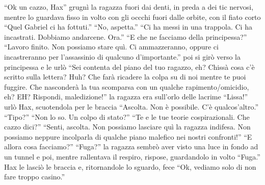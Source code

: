     ``Ok un cazzo, Hax'' grugnì la ragazza fuori dai denti, in preda a dei tic nervosi,
    mentre lo guardava fisso in volto con gli occchi fuori dalle orbite,
    con il fiato corto ``Quel Gabriel ci ha fottuti.'' ``No, aspetta.''
    ``Ci ha messi in una trappola. Ci ha incastrati. Dobbiamo andarcene.
    Ora.'' ``E che ne facciamo della principessa?'' ``Lavoro finito. Non
    possiamo stare quì. Ci ammazzeranno, oppure ci incastreranno per
    l'assassinio di qualcuno d'importante.'' poi si girò verso la
    principessa e le urlò ``Sei contenta del piano del tuo ragazzo, eh?
    Chissà cosa c'è scritto sulla lettera? Huh? Che farà ricadere la colpa
    su di noi mentre te puoi fuggire. Che nasconderà la tua scomparsa con
    un qualche rapimento/omicidio, eh? EH? Rispondi, maledizione!'' la
    ragazza era sull'orlo delle lacrime ``Lissa!'' urlò Hax, scuotendola
    per le braccia ``Ascolta. Non è possibile. C'è qualcos'altro.''
    ``Tipo?'' ``Non lo so. Un colpo di stato?'' ``Te e le tue teorie
    cospirazionali. Che cazzo dici?'' ``Senti, ascolta. Non possiamo
    lasciare quì la ragazza indifesa. Non possiamo neppure incolparla di
    qualche piano malefico nei nostri confronti!'' ``E allora cosa
    facciamo?'' ``Fuga?'' la ragazza sembrò aver visto una luce in fondo ad
    un tunnel e poi, mentre rallentava il respiro, rispose, guardandolo in
    volto ``Fuga.'' Hax le lasciò le braccia e, ritornandole lo sguardo,
    fece ``Ok, vediamo solo di non fare troppo casino.''

